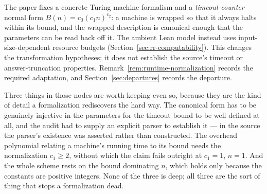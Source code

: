 \begin{remark}
\label{rem:tm-conventions}
The paper fixes a concrete Turing machine formalism and a \emph{timeout-counter} normal form
$B(n) = c_0 (c_1 n)^{c_2}$: a machine is wrapped so that it always halts within its bound,
and the wrapped description is canonical enough that the parameters can be read back off
it. The ambient Lean model instead uses input-size-dependent resource budgets
(Section~\ref{sec:rr-computability}). This changes the transformation hypotheses;
it does not establish the source's timeout or answer-truncation properties.
Remark~\ref{rem:runtime-normalization} records the required adaptation, and
Section~\ref{sec:departures} records the departure.

Three things in those nodes are worth keeping even so, because they are the kind of detail a
formalization rediscovers the hard way. The canonical form has to be genuinely injective in
the parameters for the timeout bound to be well defined at all, and the audit had to supply
an explicit parser to establish it --- in the source the parser's existence was asserted
rather than constructed. The overhead polynomial relating a machine's running time to its
bound needs the normalization $c_1 \geq 2$, without which the claim fails outright at
$c_1 = 1$, $n = 1$. And the whole scheme rests on the bound dominating $n$, which holds only
because the constants are positive integers. None of the three is deep; all three are the
sort of thing that stops a formalization dead.
\end{remark}

